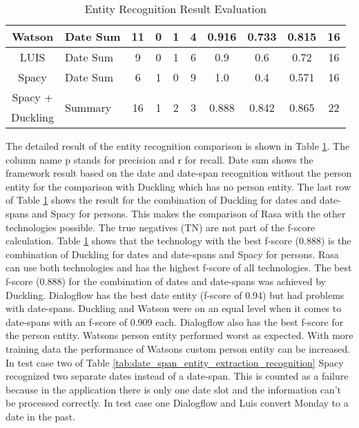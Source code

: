 \begin{table}[h]
\begin{tabular}{ c | l | c | c | c | c | c | c | c | c }
        Watson & Date Sum & 11 & 0 & 1 & 4 & 0.916 & 0.733 & 0.815 & 16 \\ \hline
        LUIS & Date Sum & 9 & 0 & 1 & 6 & 0.9 & 0.6 & 0.72 & 16 \\ \hline
        Spacy & Date Sum & 6 & 1 & 0 & 9 & 1.0 & 0.4 & 0.571 & 16 \\ \hline
        Spacy + & \multirow{2}{*}{Summary} & \multirow{2}{*}{16} & \multirow{2}{*}{1} & \multirow{2}{*}{2} & \multirow{2}{*}{3} & \multirow{2}{*}{0.888} & \multirow{2}{*}{0.842} & \multirow{2}{*}{0.865} & \multirow{2}{*}{22} \\
        Duckling & & & & & & & & & \\
    \end{tabular}
    \caption{Entity Recognition Result Evaluation} \label{tab:entity_extraction_eval}
\end{table} \noindent
The detailed result of the entity recognition comparison is shown in Table \ref{tab:entity_extraction_eval}.
The column name p stands for precision and r for recall.
Date sum shows the framework result based on the date and date-span recognition
without the person entity for the comparison with Duckling which has no person entity.
The last row of Table \ref{tab:entity_extraction_eval} shows the result for the combination 
of Duckling for dates and date-spans and Spacy for persons.
This makes the comparison of Rasa with the other technologies possible.
The true negatives (TN) are not part of the f-score calculation.
Table \ref{tab:entity_extraction_eval} shows that the technology with the 
best f-score (0.888) is the combination of Duckling for dates and date-spans and Spacy  
for persons.
Rasa can use both technologies and has the highest f-score of all technologies.
The best f-score (0.888) for the combination of dates and date-spans was achieved  
by Duckling.
Dialogflow has the best date entity (f-score of 0.94) but had problems 
with date-spans.
Duckling and Watson were on an equal level when it comes to date-spans 
with an f-score of 0.909 each.
Dialogflow also has the best f-score for the person entity.
Watsons person entity performed worst as expected.
With more training data the performance of Watsons custom person 
entity can be increased.
In test case two of Table \ref{tab:date_span_entity_extraction_recognition} Spacy 
recognized two separate dates instead of a date-span.
This is counted as a failure because in the application there is only one date slot
and the information can't be processed correctly.
In test case one Dialogflow and Luis convert Monday to a date in the past.
